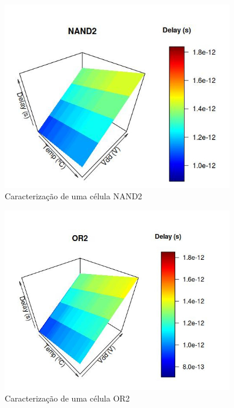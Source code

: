 \begin{figure}[H]
\center
\includegraphics[width=0.9\textwidth]{images/delays_nand2_caracterizacao_200Pontos_gauss80_10}
\caption{Caracterização de uma célula NAND2}
\label{delays_nand2_caracterizacao_200Pontos_gauss80_10}
\end{figure}
\begin{figure}[H]
\center	
\includegraphics[width=0.9\textwidth]{images/delays_or2_caracterizacao_200Pontos_gauss80_10}
\caption{Caracterização de uma célula OR2}
\label{delays_or2_caracterizacao_200Pontos_gauss80_10}
\end{figure}
